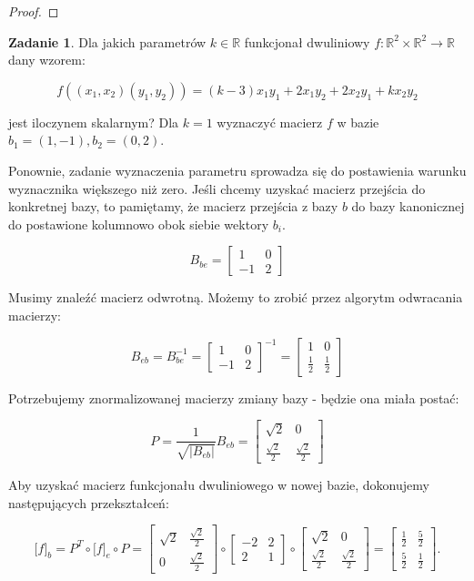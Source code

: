 \documentclass[11pt]{article}
\theoremstyle{definition}
\newtheorem{zadanie}{Zadanie}
\begin{document}
\begin{proof}
\end{proof}

\begin{zadanie}
Dla jakich parametrów $k\in\mathbb R$ funkcjonał dwuliniowy $f:\mathbb R^2\times\mathbb R^2\to\mathbb R$ dany wzorem:

$$f((x_1,x_2)(y_1,y_2))=(k-3)x_1y_1+2x_1y_2+2x_2y_1+kx_2y_2$$

jest iloczynem skalarnym? Dla $k=1$ wyznaczyć macierz $f$ w bazie $b_1=(1,-1), b_2=(0,2)$.
\end{zadanie}

Ponownie, zadanie wyznaczenia parametru sprowadza się do postawienia warunku wyznacznika większego niż zero. Jeśli chcemy uzyskać macierz przejścia do konkretnej bazy, to pamiętamy, że macierz przejścia z bazy $b$ do bazy kanonicznej do postawione kolumnowo obok siebie wektory $b_i$.

$$B_{be} = \begin{bmatrix}1&0\\-1&2\end{bmatrix}$$

Musimy znaleźć macierz odwrotną. Możemy to zrobić przez algorytm odwracania macierzy:

$$B_{eb} = B_{be}^{-1} = \begin{bmatrix}1&0\\-1&2\end{bmatrix}^{-1}= \begin{bmatrix}1&0\\\frac12&\frac12\end{bmatrix}$$

Potrzebujemy znormalizowanej macierzy zmiany bazy - będzie ona miała postać:

$$P = \frac1{\sqrt{|B_{eb}|}}B_{eb} =\begin{bmatrix}\sqrt{2}&0\\\frac{\sqrt{2}}2&\frac{\sqrt{2}}2\end{bmatrix}$$

Aby uzyskać macierz funkcjonału dwuliniowego w nowej bazie, dokonujemy następujących przekształceń:

$$\big[f\big]_b = P^T\circ\big[f\big]_e\circ P =\begin{bmatrix}\sqrt{2}&\frac{\sqrt{2}}2\\0&\frac{\sqrt{2}}2\end{bmatrix}\circ \begin{bmatrix}-2&2\\2&1\end{bmatrix}\circ\begin{bmatrix}\sqrt{2}&0\\\frac{\sqrt{2}}2&\frac{\sqrt{2}}2\end{bmatrix} = \begin{bmatrix}\frac12&\frac52\\\frac52&\frac12\end{bmatrix}.$$
\end{document}
